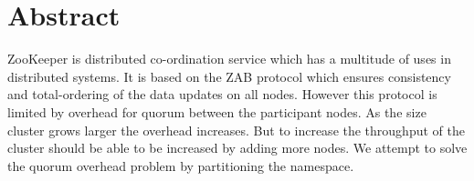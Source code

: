 \chapter{Abstract}
ZooKeeper is distributed co-ordination service which has a multitude of uses in distributed systems. It is based on the ZAB protocol which ensures consistency and total-ordering of the data updates on all nodes. However this protocol is limited by overhead for quorum between the participant nodes. As the size cluster grows larger the overhead increases. But to increase the throughput of the cluster should be able to be increased by adding more nodes. We attempt to solve the quorum overhead problem by partitioning the namespace.
